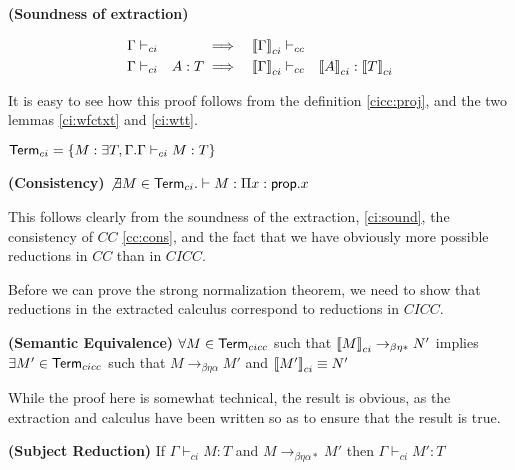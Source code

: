 \begin{theorem}

\textbf{(Soundness of extraction)}  

\begin{alignat}{4}
\Gamma &\vdash_{ci}&  & \implies & \left\llbracket \Gamma \right\rrbracket_{ci} & \vdash_{cc} &
\\
\Gamma &\vdash_{ci}& A : T & \implies & \left\llbracket \Gamma \right\rrbracket_{ci} & \vdash_{cc} & \left\llbracket A \right\rrbracket_{ci} : \left\llbracket  T  \right\rrbracket_{ci}
\end{alignat}

\label{ci:sound}
\end{theorem}

It is easy to see how this proof follows from the 
definition \ref{cicc:proj}, and the two lemmas \ref{ci:wfctxt} and \ref{ci:wtt}.

\begin{definition}
$ \mathsf{Term}_{ci}  = \{ M : \exists T,\Gamma . \Gamma \vdash_{ci} M : T \}$
\end{definition}

\begin{theorem}
\textbf{(Consistency)}  $\not \exists M \in \mathsf{Term}_{ci}. \vdash M : \Pi x : \mathsf{prop} . x$
\label{ci:cons}
\end{theorem}

This follows clearly from the soundness of the extraction, 
\ref{ci:sound}, the consistency of $CC$ \ref{cc:cons}, and the fact that we 
have obviously more possible reductions in $CC$ than in $CICC$.  

Before we can prove the strong normalization theorem, we need to show that reductions in the extracted calculus 
correspond to reductions in $CICC$. 

\begin{theorem}
\textbf{(Semantic Equivalence)} 
$\forall M \in \mathsf{Term}_{cicc}$ such that $\left\llbracket M \right\rrbracket_{ci} \rightarrow_{\beta\eta*} N'$
implies 
$\exists M' \in \mathsf{Term}_{cicc}$ such that $M \rightarrow_{\beta\eta\alpha} M'$ and $\left\llbracket M' \right\rrbracket_{ci} \equiv N'$
\label{ci:se}
\end{theorem}

While the proof here is somewhat technical, the result is obvious, as the extraction and calculus
have been written so as to ensure that the result is true.

\begin{theorem}
\textbf{(Subject Reduction)} If $\Gamma \vdash_{ci} M : T$ and $M \rightarrow_{\beta\eta\alpha*} M'$ then $\Gamma \vdash_{ci} M' : T$
\end{theorem}

